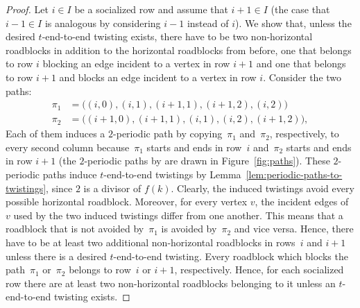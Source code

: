 \documentclass[10pt,a4paper]{article}
\begin{document}
\begin{proof}
	Let $i\in I$ be a socialized row
	and assume that $i+1 \in I$ (the case that $i-1 \in I$
	is analogous by considering $i-1$ instead of $i$).
	We show that,
	unless the desired $t$-end-to-end twisting exists,
	there have to be two non-horizontal roadblocks in addition to the horizontal roadblocks from before,
	one that belongs to row $i$ blocking an edge incident to a vertex in row $i+1$
	and one that belongs to row $i+1$ and blocks an edge incident to a vertex in row $i$.
	Consider the two paths:
		\begin{align*}
		\pi_1&= \big((i,0),(i,1),(i+1,1),(i+1,2),(i,2)\big)\\
		\pi_2&= \big((i+1,0),(i+1,1),(i,1),(i,2),(i+1,2)\big),
	\end{align*}
	Each of them induces a $2$-periodic path by  copying~$\pi_1$ and~$\pi_2$, respectively, to every second column because~$\pi_1$ starts and ends in row~$i$ and~$\pi_2$ starts and ends in row $i+1$ (the $2$-periodic paths by are drawn in Figure~\ref{fig:paths}).
	These $2$\nobreakdash-periodic paths induce $t$\nobreakdash-end-to-end twistings
	by Lemma~\ref{lem:periodic-paths-to-twistings}, since $2$ is a divisor of $f(k)$. Clearly, the induced twistings
 avoid every possible horizontal roadblock.
 Moreover, for every vertex $v$, the incident edges of $v$ used by the two induced twistings differ from one another.
	This means that a roadblock that is not avoided by~$\pi_1$
	is avoided by~$\pi_2$ and vice versa.
	Hence, there have to be at least two additional non-horizontal roadblocks
	in rows~$i$ and $i+1$
	unless there is a desired $t$\nobreakdash-end-to-end twisting.
	Every roadblock which blocks the path~$\pi_1$ or~$\pi_2$
	belongs to row~$i$ or $i+1$, respectively.
	Hence,  for each socialized row there are at least two non-horizontal roadblocks belonging to it unless an $t$-end-to-end twisting exists.
	

\end{proof}
\end{document}
